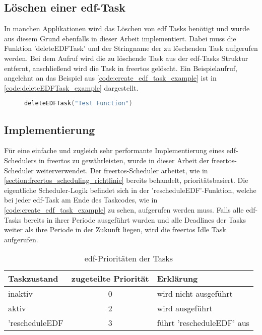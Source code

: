 \documentclass[../EDF Master Thesis.tex]{subfiles}
\begin{document}
\subsection{Löschen einer \acf{edf}-Task} \label{section:löschen_einer_edf_task}

    In manchen Applikationen wird das Löschen von \ac{edf} Tasks benötigt und wurde aus diesem Grund ebenfalls in dieser Arbeit implementiert.
    Dabei muss die Funktion 'deleteEDFTask' und der Stringname der zu löschenden Task aufgerufen werden.
    Bei dem Aufruf wird die zu löschende Task aus der \ac{edf}-Tasks Struktur entfernt, anschließend wird die Task in \ac{freertos} gelöscht.
    Ein Beispielaufruf, angelehnt an das Beispiel aus \autoref{code:create_edf_task_example} ist in \autoref{code:deleteEDFTask_example} dargestellt.

\begin{figure}[ht!]
\begin{lstlisting}[language=C, caption=deleteEDFTask Beispiel, label=code:deleteEDFTask_example]
    deleteEDFTask("Test Function")
\end{lstlisting}
\end{figure}


\subsection{Implementierung} \label{section:implementierung}
    Für eine einfache und zugleich sehr performante Implementierung eines \ac{edf}-Schedulers in \ac{freertos} zu gewährleisten, wurde in dieser Arbeit der \ac{freertos}-Scheduler weiterverwendet.
    Der \ac{freertos}-Scheduler arbeitet, wie in \autoref{section:freertos_scheduling_richtlinie} bereits behandelt, prioritätsbasiert.
    Die eigentliche Scheduler-Logik befindet sich in der 'rescheduleEDF'-Funktion, welche bei jeder \ac{edf}-Task am Ende des Taskcodes, wie in \autoref{code:create_edf_task_example} zu sehen, aufgerufen werden muss.
    Falls alle \ac{edf}-Tasks bereits in ihrer Periode ausgeführt wurden und alle Deadlines der Tasks weiter als ihre Periode in der Zukunft liegen, wird die \ac{freertos} Idle Task aufgerufen.

    \begin{table}[ht!]
        \centering
        \begin{tabular}{l|c|l}
            Taskzustand & zugeteilte Priorität & Erklärung\\
            \hline
            inaktiv & 0 & wird nicht ausgeführt\\
            aktiv & 2 & wird ausgeführt\\
            'rescheduleEDF & 3 & führt 'rescheduleEDF' aus
        \end{tabular}
        \caption{\ac{edf}-Prioritäten der Tasks}
        \label{table:edf_prioritaeten_der_tasks}
    \end{table}
\end{document}
